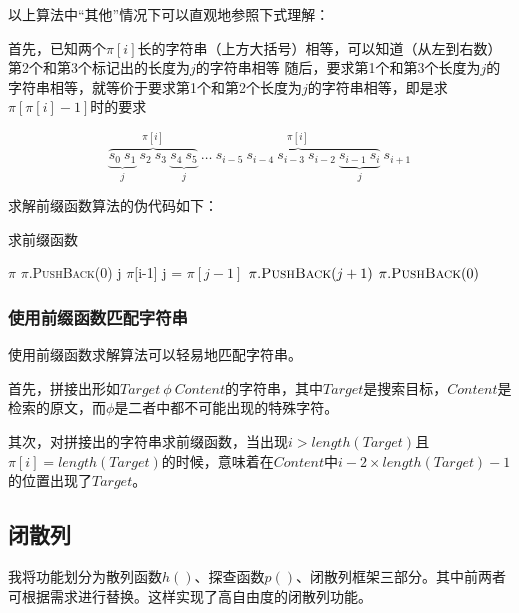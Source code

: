 \documentclass[scheme = chinese]{ctexart}
\begin{document}
以上算法中“其他”情况下可以直观地参照下式理解：
\begin{outline}
    \1 首先，已知两个$\pi[i]$长的字符串（上方大括号）相等，可以知道（从左到右数）第2个和第3个标记出的长度为$j$的字符串相等
    \1 随后，要求第1个和第3个长度为$j$的字符串相等，就等价于要求第1个和第2个长度为$j$的字符串相等，即是求$\pi[\pi[i]-1]$时的要求
\end{outline}
$$ \overbrace{\underbrace{s_0 ~ s_1}_j ~ s_2 ~ s_3 ~ \underbrace{s_4 ~ s_5}_j}^{\pi[i]} ~ \dots ~ \overbrace{s_{i-5} ~ s_{i-4} ~ s_{i-3} ~ s_{i-2} ~ \underbrace{s_{i-1} ~ s_{i}}_j}^{\pi[i]} ~ s_{i+1} $$

\clearpage

求解前缀函数算法的伪代码如下：
\begin{algorithm}[H]
    \caption{求前缀函数}
    \begin{algorithmic}[1]
            \State $\pi$ \gets [~]
            \State $\pi$.\textsc{PushBack}(0)
                \State j \gets $\pi$[i-1]
                    j = $\pi[j - 1]$
                \EndWhile
                    \State $\pi.\textsc{PushBack}(j+1)$
                \Else
                    \State $\pi.\textsc{PushBack}(0)$
                \EndIf
            \EndFor
        \EndProcedure
    \end{algorithmic}
\end{algorithm}

\subsubsection{使用前缀函数匹配字符串}
使用前缀函数求解算法可以轻易地匹配字符串。

首先，拼接出形如$Target~\phi~Content$的字符串，其中$Target$是搜索目标，$Content$是检索的原文，而$\phi$是二者中都不可能出现的特殊字符。

其次，对拼接出的字符串求前缀函数，当出现$i>length(Target)$且$\pi[i] = length(Target)$的时候，意味着在$Content$中$i-2\times length(Target) - 1$的位置出现了$Target$。

\subsection{闭散列}
我将功能划分为散列函数$h()$、探查函数$p()$、闭散列框架三部分。其中前两者可根据需求进行替换。这样实现了高自由度的闭散列功能。
\end{document}

